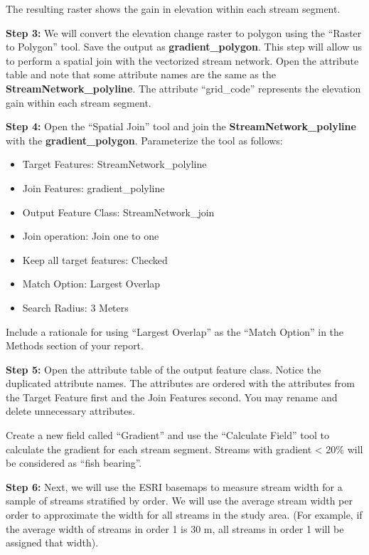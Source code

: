 \documentclass[
]{book}
\providecommand{\tightlist}{%
  \setlength{\itemsep}{0pt}\setlength{\parskip}{0pt}}
\begin{document}
The resulting raster shows the gain in elevation within each stream segment.

\textbf{Step 3:} We will convert the elevation change raster to polygon using the ``Raster to Polygon'' tool. Save the output as \textbf{gradient\_polygon}. This step will allow us to perform a spatial join with the vectorized stream network. Open the attribute table and note that some attribute names are the same as the \textbf{StreamNetwork\_polyline}. The attribute ``grid\_code'' represents the elevation gain within each stream segment.

\textbf{Step 4:} Open the ``Spatial Join'' tool and join the \textbf{StreamNetwork\_polyline} with the \textbf{gradient\_polygon}. Parameterize the tool as follows:

\begin{itemize}
\tightlist
\item
  Target Features: StreamNetwork\_polyline
\item
  Join Features: gradient\_polyline
\item
  Output Feature Class: StreamNetwork\_join
\item
  Join operation: Join one to one
\item
  Keep all target features: Checked
\item
  Match Option: Largest Overlap
\item
  Search Radius: 3 Meters
\end{itemize}

Include a rationale for using ``Largest Overlap'' as the ``Match Option'' in the Methods section of your report.

\textbf{Step 5:} Open the attribute table of the output feature class. Notice the duplicated attribute names. The attributes are ordered with the attributes from the Target Feature first and the Join Features second. You may rename and delete unnecessary attributes.

Create a new field called ``Gradient'' and use the ``Calculate Field'' tool to calculate the gradient for each stream segment. Streams with gradient \textless{} 20\% will be considered as ``fish bearing''.

\textbf{Step 6:} Next, we will use the ESRI basemaps to measure stream width for a sample of streams stratified by order. We will use the average stream width per order to approximate the width for all streams in the study area. (For example, if the average width of streams in order 1 is 30 m, all streams in order 1 will be assigned that width).
\end{document}
